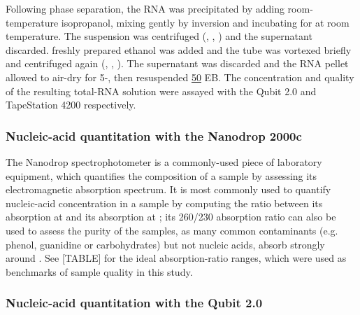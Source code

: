 Following phase separation, the RNA was precipitated by adding  room-temperature isopropanol, mixing gently by inversion and incubating for  at room temperature. The suspension was centrifuged (, , ) and the supernatant discarded.  freshly prepared  ethanol was added and the tube was vortexed briefly and centrifuged again (, , ). The supernatant was discarded and the RNA pellet allowed to air-dry for 5-, then resuspended \ul{50} EB. The concentration and quality of the resulting total-RNA solution were assayed with the Qubit 2.0 and TapeStation 4200 respectively. %

\subsubsection{Nucleic-acid quantitation with the Nanodrop 2000c} %

The Nanodrop spectrophotometer is a commonly-used piece of laboratory equipment, which quantifies the composition of a sample by assessing its electromagnetic absorption spectrum. It is most commonly used to quantify nucleic-acid concentration in a sample by computing the ratio between its absorption at  and its absorption at ; its 260/230 absorption ratio can also be used to assess the purity of the samples, as many common contaminants (e.g. phenol, guanidine or carbohydrates) but not nucleic acids, absorb strongly around . See [TABLE] for the ideal absorption-ratio ranges, which were used as benchmarks of sample quality in this study. %

\subsubsection{Nucleic-acid quantitation with the Qubit 2.0} %


